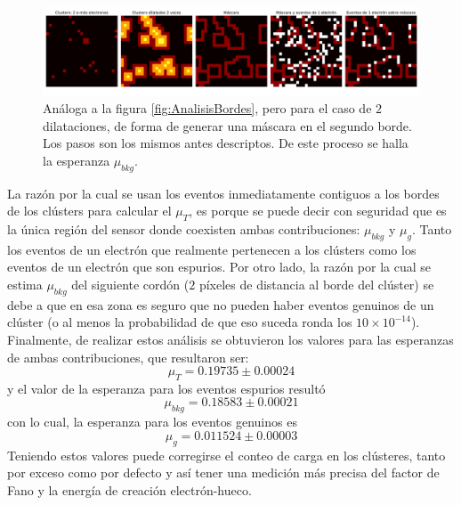 \begin{figure}[h]
    \centering
    \includegraphics[scale=0.4]{Figs/analisis_bordesx2.pdf}
    \caption{\footnotesize{Análoga a la figura \ref{fig:AnalisisBordes}, pero para el caso de $2$ dilataciones, de forma de generar una máscara en el segundo borde. Los pasos son los mismos antes descriptos. De este proceso se halla la esperanza $\mu_{bkg}$.}}
    \label{fig:AnalisisBordesx2}
\end{figure}
La razón por la cual se usan los eventos inmediatamente contiguos a los bordes de los clústers para calcular el $\mu_{T}$, es porque se puede decir con seguridad que es la única región del sensor donde coexisten ambas contribuciones: $\mu_{bkg}$ y $\mu_{g}$. Tanto los eventos de un electrón que realmente pertenecen a los clústers como los eventos de un electrón que son espurios. Por otro lado, la razón por la cual se estima $\mu_{bkg}$ del siguiente cordón ($2$ píxeles de distancia al borde del clúster) se debe a que en esa zona es seguro que no pueden haber eventos genuinos de un clúster (o al menos la probabilidad de que eso suceda ronda los $10\times 10^{-14}$).\\
\indent Finalmente, de realizar estos análisis se obtuvieron los valores para las esperanzas de ambas contribuciones, que resultaron ser:
\begin{equation*}
    \mu_{T} = 0.19735 \pm 0.00024
\end{equation*} 
y el valor de la esperanza para los eventos espurios resultó 
\begin{equation*}
    \mu_{bkg} = 0.18583 \pm 0.00021
\end{equation*}
con lo cual, la esperanza para los eventos genuinos es 
\begin{equation*}
    \mu_{g} = 0.011524 \pm 0.00003
\end{equation*}
Teniendo estos valores puede corregirse el conteo de carga en los clústeres, tanto por exceso como por defecto y así tener una medición más precisa del factor de Fano y la energía de creación electrón-hueco.

